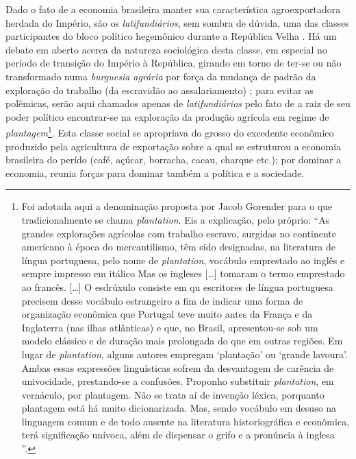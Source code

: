Dado o fato de a economia brasileira manter sua característica agroexportadora herdada do Império, são os \textit{latifundiários}, sem sombra de dúvida, uma das classes participantes do bloco político hegemônico durante a República Velha \cite{gorender_burguesia_1990,oliveira_emopro_1977,CARONE1970inst}. Há um debate em aberto acerca da natureza sociológica desta classe, em especial no período de transição do Império à República, girando em torno de ter-se ou não transformado numa \textit{burguesia agrária} por força da mudança de padrão da exploração do trabalho (da escravidão ao assalariamento) \cite{gorender_burguesia_1990,oliveira_emopro_1977}; para evitar as polêmicas, serão aqui chamados apenas de \textit{latifundiários} pelo fato de a raiz de seu poder político encontrar-se na exploração da produção agrícola em regime de \textit{plantagem}\footnote{Foi adotada aqui a denominação proposta por Jacob Gorender para o que tradicionalmente se chama \textit{plantation}. Eis a explicação, pelo próprio: ``As grandes explorações agrícolas com trabalho escravo, surgidas no continente americano à época do mercantilismo, têm sido designadas, na literatura de língua portuguesa, pelo nome de \textit{plantation}, vocábulo emprestado ao inglês e sempre impresso em itálico Mas os ingleses [\dots] tomaram o termo emprestado ao francês. [\dots] O esdrúxulo consiste em qu escritores de língua portuguesa precisem desse vocábulo estrangeiro a fim de indicar uma forma de organização econômica que Portugal teve muito antes da França e da Inglaterra (nas ilhas atlânticas) e que, no Brasil, apresentou-se sob um modelo clássico e de duração mais prolongada do que em outras regiões. Em lugar de \textit{plantation}, alguns autores empregam `plantação' ou `grande lavoura'. Ambas essas expressões linguísticas sofrem da desvantagem de carência de univocidade, prestando-se a confusões. Proponho substituir \textit{plantation}, em vernáculo, por plantagem. Não se trata aí de invenção léxica, porquanto plantagem está há muito dicionarizada. Mas, sendo vocábulo em desuso na linguagem comum e de todo ausente na literatura historiográfica e econômica, terá significação unívoca, além de dispensar o grifo e a pronúncia à inglesa \cite[pp.~119-120]{gorender_escracolo_2010}''.}. Esta classe social se apropriava do grosso do excedente econômico produzido pela agricultura de exportação sobre a qual se estruturou a economia brasileira do perído (café, açúcar, borracha, cacau, charque etc.); por dominar a economia, reunia forças para dominar também a política e a sociedade.

